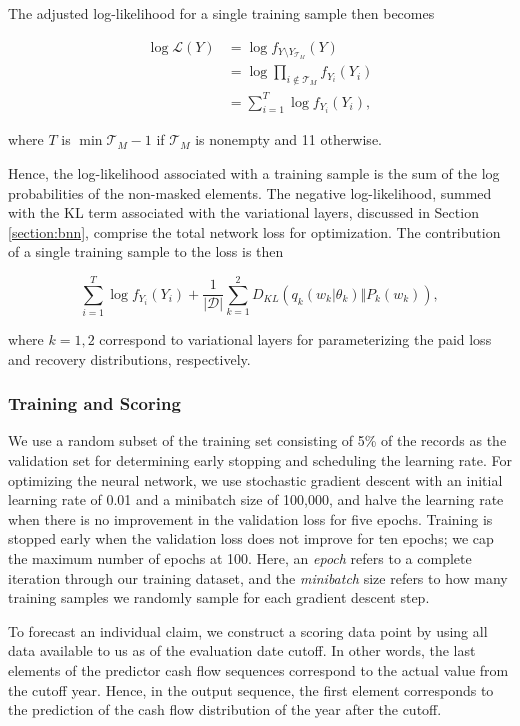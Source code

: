\documentclass{article}
\begin{document}
The adjusted log-likelihood for a single training sample then becomes

\begin{align}
    \log\mathcal{L}(Y) &= \log  f_{Y\setminus Y_{\mathcal{T}_M}}(Y)\\
                       &= \log \prod_{i \notin \mathcal{T}_M} f_{Y_i}(Y_i)\\
                       &= \sum_{i = 1}^{T}\log f_{Y_i}(Y_i),
\end{align}

where $T$ is $\min \mathcal{T}_M - 1$ if $\mathcal{T}_M$ is nonempty and 11 
otherwise.

Hence, the log-likelihood associated with a training sample is the sum of the 
log probabilities of the non-masked elements. The negative log-likelihood, 
summed with the KL term associated with the variational layers, discussed in 
Section  \ref{section:bnn}, comprise the total network loss for optimization. 
The contribution of a single training sample to the loss is then

\begin{equation}
    \sum_{i = 1}^{T}\log f_{Y_i}(Y_i) + \frac{1}{|\mathcal{D}|}\sum_{k=1}^2D_{KL}(q_k(w_k|\theta_k) \Vert P_k(w_k)),
\end{equation}

where $k=1, 2$ correspond to variational layers for parameterizing the paid loss
and recovery distributions, respectively.

\subsubsection{Training and Scoring}

We use a random subset of the training set consisting of 5\% of the records as 
the validation set for determining early stopping and scheduling the learning 
rate. For optimizing the neural network, we use stochastic gradient descent with
an initial learning rate of 0.01 and a minibatch size of 100,000, and halve the 
learning rate when there is no improvement in the validation loss for five
epochs. Training is stopped early when the validation loss does not improve for 
ten epochs; we cap the maximum number of epochs at 100. Here, an \textit{epoch} 
refers to a complete iteration through our training dataset, and the 
\textit{minibatch} size refers to how many training samples we randomly sample 
for each gradient descent step.

To forecast an individual claim, we construct a scoring data point by using all
data available to us as of the evaluation date cutoff. In other words, the last
elements of the predictor cash flow sequences correspond to the actual value
from the cutoff year. Hence, in the output sequence, the first element 
corresponds to the prediction of the cash flow distribution of the year after
the cutoff.
\end{document}
